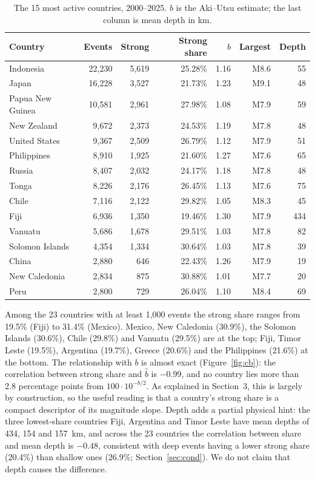 \documentclass[11pt,a4paper]{article}
\begin{document}
\begin{table}[H]\centering\small
\caption{The 15 most active countries, 2000--2025. $b$ is the Aki--Utsu estimate; the last column is mean depth in km.\label{tab:countries}}
\begin{tabular}{lrrrrrr}\toprule
Country & Events & Strong & Strong share & $b$ & Largest & Depth\\\midrule
Indonesia & 22,230 & 5,619 & 25.28\% & 1.16 & M8.6 & 55\\
Japan & 16,228 & 3,527 & 21.73\% & 1.23 & M9.1 & 48\\
Papua New Guinea & 10,581 & 2,961 & 27.98\% & 1.08 & M7.9 & 59\\
New Zealand & 9,672 & 2,373 & 24.53\% & 1.19 & M7.8 & 48\\
United States & 9,367 & 2,509 & 26.79\% & 1.12 & M7.9 & 51\\
Philippines & 8,910 & 1,925 & 21.60\% & 1.27 & M7.6 & 65\\
Russia & 8,407 & 2,032 & 24.17\% & 1.18 & M7.8 & 48\\
Tonga & 8,226 & 2,176 & 26.45\% & 1.13 & M7.6 & 75\\
Chile & 7,116 & 2,122 & 29.82\% & 1.05 & M8.3 & 45\\
Fiji & 6,936 & 1,350 & 19.46\% & 1.30 & M7.9 & 434\\
Vanuatu & 5,686 & 1,678 & 29.51\% & 1.03 & M7.8 & 82\\
Solomon Islands & 4,354 & 1,334 & 30.64\% & 1.03 & M7.8 & 39\\
China & 2,880 & 646 & 22.43\% & 1.26 & M7.9 & 19\\
New Caledonia & 2,834 & 875 & 30.88\% & 1.01 & M7.7 & 20\\
Peru & 2,800 & 729 & 26.04\% & 1.10 & M8.4 & 69\\
\bottomrule
\end{tabular}
\end{table}

Among the 23 countries with at least 1,000 events the strong share ranges from 19.5\% (Fiji) to 31.4\% (Mexico). Mexico, New Caledonia (30.9\%), the Solomon Islands (30.6\%), Chile (29.8\%) and Vanuatu (29.5\%) are at the top; Fiji, Timor Leste (19.5\%), Argentina (19.7\%), Greece (20.6\%) and the Philippines (21.6\%) at the bottom. The relationship with $b$ is almost exact (Figure~\ref{fig:cb}): the correlation between strong share and $\hat b$ is $-0.99$, and no country lies more than 2.8 percentage points from $100\cdot10^{-b/2}$. As explained in Section~3, this is largely by construction, so the useful reading is that a country's strong share is a compact descriptor of its magnitude slope. Depth adds a partial physical hint: the three lowest-share countries Fiji, Argentina and Timor Leste have mean depths of 434, 154 and 157~km, and across the 23 countries the correlation between share and mean depth is $-0.48$, consistent with deep events having a lower strong share (20.4\%) than shallow ones (26.9\%; Section~\ref{sec:cond}). We do not claim that depth causes the difference.
\end{document}
